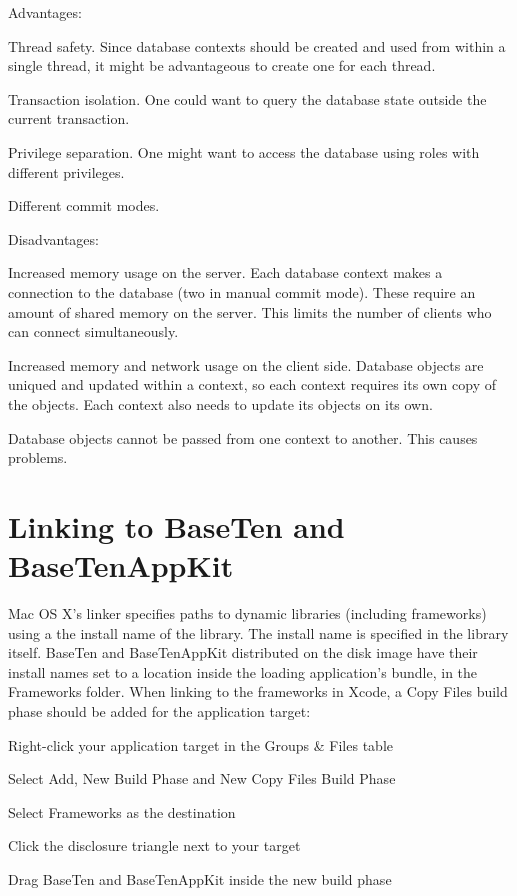 Advantages\+: \begin{DoxyItemize}
\item Thread safety. Since database contexts should be created and used from within a single thread, it might be advantageous to create one for each thread. \item Transaction isolation. One could want to query the database state outside the current transaction. \item Privilege separation. One might want to access the database using roles with different privileges. \item Different commit modes.\end{DoxyItemize}
Disadvantages\+: \begin{DoxyItemize}
\item Increased memory usage on the server. Each database context makes a connection to the database (two in manual commit mode). These require an amount of shared memory on the server. This limits the number of clients who can connect simultaneously. \item Increased memory and network usage on the client side. Database objects are uniqued and updated within a context, so each context requires its own copy of the objects. Each context also needs to update its objects on its own. \item Database objects cannot be passed from one context to another. This causes problems. \end{DoxyItemize}
\hypertarget{linking_to_baseten}{}\section{Linking to Base\+Ten and Base\+Ten\+App\+Kit}\label{linking_to_baseten}
Mac O\+S X's linker specifies paths to dynamic libraries (including frameworks) using a the install name of the library. The install name is specified in the library itself. Base\+Ten and Base\+Ten\+App\+Kit distributed on the disk image have their install names set to a location inside the loading application's bundle, in the Frameworks folder. When linking to the frameworks in Xcode, a Copy Files build phase should be added for the application target\+: 
\begin{DoxyEnumerate}
\item Right-\/click your application target in the Groups \& Files table 
\item Select Add, New Build Phase and New Copy Files Build Phase 
\item Select Frameworks as the destination 
\item Click the disclosure triangle next to your target 
\item Drag Base\+Ten and Base\+Ten\+App\+Kit inside the new build phase 
\end{DoxyEnumerate}

